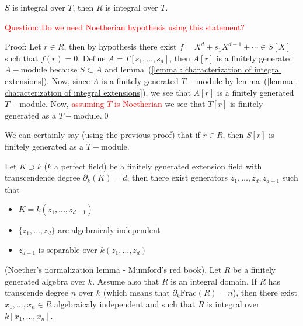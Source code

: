 \begin{itemize}
\begin{corollary}
        $S$ is integral over $T$, then $R$ is integral over $T$.\par 
        \textcolor{red}{Question: Do we need Noetherian hypothesis using this statement?}
    \end{corollary}
    Proof: Let $r\in R$, then by hypothesis there exist $f=X^d+s_1X^{d-1}+\cdots\in S[X]$ such that $f(r)=0$.
    Define $A=T[s_1,\dots,s_d]$, then $A[r]$ is a finitely generated $A-$module because $S\subset A$ and lemma~(\ref{lemma : characterization of integral extensions}). 
    Now, since $A$ is a finitely generated $T-$module by lemma~(\ref{lemma : characterization of integral extensions}),
    we see that $A[r]$ is a finitely generated $T-$module. Now, \textcolor{red}{assuming $T$ is Noetherian} we see that 
    $T[r]$ is finitely generated as a $T-$module.\qed

    \begin{remark}
        We can certainly say (using the previous proof) that if $r\in R$, then $S[r]$ is finitely generated 
        as a $T-$module.
    \end{remark}

    \begin{lemma}\label{lemma : extension field transcendence degree}
        Let $K\supset k$ ($k$ a perfect field) be a finitely generated extension field with transcendence degree $\partial_k(K)=d$, then 
        there exist generators $z_1,\dots,z_d,z_{d+1}$ such that 
        \begin{itemize}
            \item[(1)] $K=k(z_1,\dots,z_{d+1})$
            \item[(2)] $\{z_1,\dots,z_d\}$ are algebraicaly independent
            \item[(3)] $z_{d+1}$ is separable over $k(z_1,\dots, z_d)$ 
        \end{itemize} 
    \end{lemma}  
\end{itemize}

\begin{dang}
\begin{lemma}
    (Noether's normalization lemma - Mumford's red book). Let $R$ be a finitely generated algebra over $k$. Assume also that $R$ is an integral domain.
    If $R$ has transcende degree $n$ over $k$ (which means that $\partial_k\text{Frac}(R)=n$), then 
    there exist $x_1,\dots, x_n\in R$ algebraicaly independent and such that $R$ is integral 
    over $k[x_1,\dots,x_n]$.
\end{lemma}
\end{dang}

